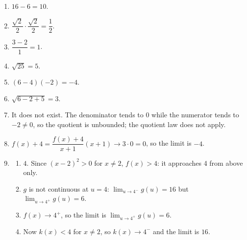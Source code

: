 \documentclass[11pt]{article}
\begin{document}
\newpage
\begin{solbox}
\begin{enumerate}[leftmargin=*,itemsep=4pt]
  \item $16-6=10$.
  \item $\dfrac{\sqrt2}{2}\cdot\dfrac{\sqrt2}{2}=\dfrac12$.
  \item $\dfrac{3-2}{1}=1$.
  \item $\sqrt{25}=5$.
  \item $(6-4)(-2)=-4$.
  \item $\sqrt{6-2+5}=3$.
  \item It does not exist. The denominator tends to 0 while the numerator tends to $-2\neq0$, so the quotient is unbounded; the quotient law does not apply.
  \item $f(x)+4=\dfrac{f(x)+4}{x+1}(x+1)\to3\cdot0=0$, so the limit is $-4$.
  \item \begin{enumerate}[label=(\alph*),leftmargin=*,itemsep=3pt]
    \item $4$. Since $(x-2)^2>0$ for $x\neq2$, $f(x)>4$: it approaches 4 from above only.
    \item $g$ is not continuous at $u=4$: $\displaystyle\lim_{u\to 4^-}g(u)=16$ but $\displaystyle\lim_{u\to 4^+}g(u)=6$.
    \item $f(x)\to4^+$, so the limit is $\displaystyle\lim_{u\to 4^+}g(u)=6$.
    \item Now $k(x)<4$ for $x\neq2$, so $k(x)\to4^-$ and the limit is $16$.
  \end{enumerate}
\end{enumerate}
\end{solbox}
\end{document}
